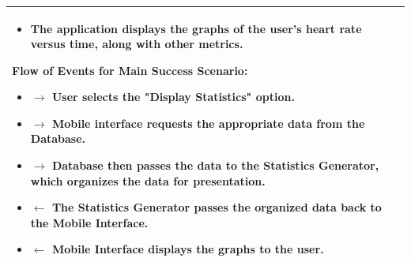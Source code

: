\documentclass[letterpaper,english, 12pt]{scrreprt}
\begin{document}
\begin{center}
\begin{tabular}{|C{15cm}|}
\begin{itemize}
                                        \item The application displays the graphs of the user's heart rate versus time, along with other metrics.
                                \end{itemize}
                        \begin{flushleft}
                                \textbf{Flow of Events for Main Success Scenario: }
                        \end{flushleft}
                                \begin{itemize}
                                        \item $\rightarrow$ User selects the "Display Statistics" option.
					\item $\rightarrow$ Mobile interface requests the appropriate data from the Database.
					\item $\rightarrow$ Database then passes the data to the Statistics Generator, which organizes the data for presentation.
                                        \item $\leftarrow$ The Statistics Generator passes the organized data back to the Mobile Interface.
                                        \item $\leftarrow$ Mobile Interface displays the graphs to the user.
                                \end{itemize}
				\\
                \hline
        \end{tabular}
\end{center}
\end{document}
